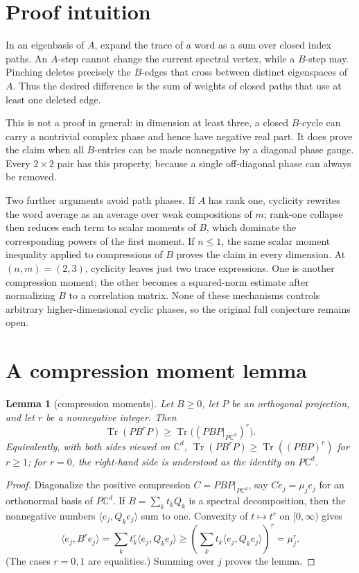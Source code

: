 \documentclass[11pt]{article}
\newtheorem{lemma}[theorem]{Lemma}
\newcommand{\Tr}{\operatorname{Tr}}
\newcommand{\C}{\mathbb C}
\begin{document}
\section{Proof intuition}
In an eigenbasis of \(A\), expand the trace of a word as a sum over closed
index paths. An \(A\)-step cannot change the current spectral vertex, while
a \(B\)-step may. Pinching deletes precisely the \(B\)-edges that cross
between distinct eigenspaces of \(A\). Thus the desired difference is the
sum of weights of closed paths that use at least one deleted edge.

This is not a proof in general: in dimension at least three, a closed
\(B\)-cycle can carry a nontrivial complex phase and hence have negative
real part. It does prove the claim when all \(B\)-entries can be made
nonnegative by a diagonal phase gauge. Every \(2\times2\) pair has this
property, because a single off-diagonal phase can always be removed.

Two further arguments avoid path phases. If \(A\) has rank one, cyclicity
rewrites the word average as an average over weak compositions of \(m\);
rank-one collapse then reduces each term to scalar moments of \(B\), which
dominate the corresponding powers of the first moment. If \(n\leq1\), the
same scalar moment inequality applied to compressions of \(B\) proves the
claim in every dimension. At \((n,m)=(2,3)\), cyclicity leaves just two
trace expressions. One is another compression moment; the other becomes a
squared-norm estimate after normalizing \(B\) to a correlation matrix.
None of these mechanisms controls arbitrary higher-dimensional cyclic
phases, so the original full conjecture remains open.

\section{A compression moment lemma}
\begin{lemma}[compression moments]\label{lem:compression}
Let \(B\geq0\), let \(P\) be an orthogonal projection, and let \(r\) be a
nonnegative integer. Then
\begin{equation}\label{eq:compression}
 \Tr(PB^rP)\geq \Tr\bigl((PBP|_{P\C^d})^r\bigr).
\end{equation}
Equivalently, with both sides viewed on \(\C^d\),
\(\Tr(PB^rP)\geq\Tr((PBP)^r)\) for \(r\geq1\); for \(r=0\), the right-hand
side is understood as the identity on \(P\C^d\).
\end{lemma}
\begin{proof}
Diagonalize the positive compression \(C=PBP|_{P\C^d}\), say
\(Ce_j=\mu_j e_j\) for an orthonormal basis of \(P\C^d\). If
\(B=\sum_k t_k Q_k\) is a spectral decomposition, then the nonnegative
numbers \(\langle e_j,Q_ke_j\rangle\) sum to one. Convexity of
\(t\mapsto t^r\) on \([0,\infty)\) gives
\[
 \langle e_j,B^r e_j\rangle
 =\sum_k t_k^r\langle e_j,Q_ke_j\rangle
 \geq
 \left(\sum_k t_k\langle e_j,Q_ke_j\rangle\right)^r
 =\mu_j^r.
\]
(The cases \(r=0,1\) are equalities.) Summing over \(j\) proves the lemma.
\end{proof}
\end{document}
